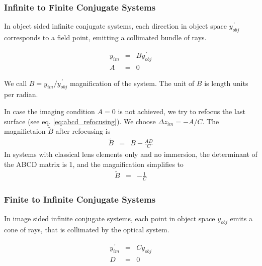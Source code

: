 \documentclass[12pt,a4paper,twoside,openright,BCOR10mm,headsepline,titlepage,abstracton,chapterprefix,final]{scrreprt}
\begin{document}
\subsubsection{Infinite to Finite Conjugate Systems}
In object sided infinite conjugate systems, each direction in object space $y^{\,\prime}_{obj}$ corresponds to a field point, 
emitting a collimated bundle of rays.

\begin{eqnarray}
   y_{im} &=& B y^{\,\prime}_{obj} \\
   A &=& 0
\end{eqnarray}

We call $B = y_{im} / y^{\,\prime}_{obj}$ magnification of the system.
The unit of $B$ is length units per radian.

In case the imaging condition $A=0$ is not achieved, we try to refocus the last surface (see eq. \ref{eq:abcd_refocusing}).
We choose $\Delta z_{im} = - A / C $.
The magnifictaion $\tilde{B}$ after refocusing is
\begin{eqnarray}
 \tilde{B} &=& B - \frac{AD}{C} 
\end{eqnarray}
In systems with classical lens elements only and no immersion, the determinant of the ABCD matrix is 1, and the magnification simplifies to
\begin{eqnarray}
 \tilde{B} &=& - \frac{1}{C} 
\end{eqnarray}


\subsubsection{Finite to Infinite Conjugate Systems}
In image sided infinite conjugate systems, each point in object space $y_{obj}$ emits a cone of rays, 
that is collimated by the optical system.

\begin{eqnarray}
   y^{\,\prime}_{im} &=& C y_{obj} \\
   D &=& 0
\end{eqnarray}
\end{document}
